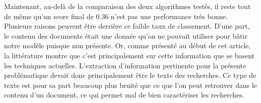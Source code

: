Maintenant, au-delà de la comparaison des deux algorithmes testés, il reste tout de même qu'un score final de 0.36 n'est pas une performance très bonne. Plusieurs raisons peuvent être derrière ce faible taux de classement. D'une part, le contenu des documents était une donnée qu'on ne pouvait utiliser pour bâtir notre modèle puisque non présente. Or, comme présenté au début de cet article, la littérature montre que c'est principalement sur cette information que se basent les techniques actuelles. L'extraction d'information pertinente pour la présente problématique devait donc principalement être le texte des recherches. Ce type de texte est pour sa part beaucoup plus bruité que ce que l'on peut retrouver dans le contenu d'un document, ce qui permet mal de bien caractériser les recherches.

	
